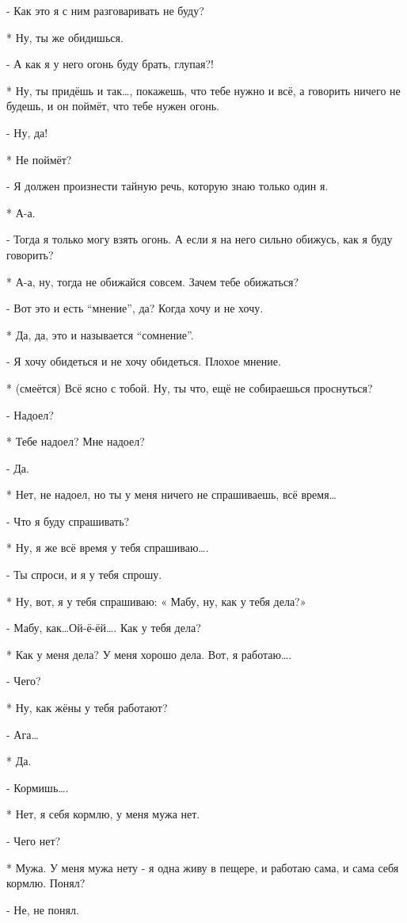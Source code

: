 - Как это я с ним разговаривать не буду?

* Ну, ты же обидишься.

- А как я у него огонь буду брать, глупая?!

* Ну, ты придёшь и так…, покажешь, что тебе нужно и всё, а говорить ничего не будешь, и он поймёт, что тебе нужен огонь.

- Ну, да!

* Не поймёт?

- Я должен произнести тайную речь, которую знаю только один я.

* А-а.

- Тогда я только могу взять огонь. А если я на него сильно обижусь, как я буду говорить?

* А-а, ну, тогда не обижайся совсем. Зачем тебе обижаться?

- Вот это и есть “мнение”, да? Когда хочу и не хочу.

* Да, да, это и называется “сомнение”.

- Я хочу обидеться и не хочу обидеться. Плохое мнение.

* (смеётся) Всё ясно с тобой. Ну, ты что, ещё не собираешься проснуться?

- Надоел?

* Тебе надоел? Мне надоел?

- Да.

* Нет, не надоел, но ты у меня ничего не спрашиваешь, всё время…

- Что я буду спрашивать?

* Ну, я же всё время у тебя спрашиваю….

- Ты спроси, и я у тебя спрошу.

* Ну, вот, я у тебя спрашиваю: « Мабу, ну, как у тебя дела?»

-  Мабу, как…Ой-ё-ёй…. Как у тебя дела?

* Как у меня дела? У меня хорошо дела. Вот, я работаю….

- Чего?

* Ну, как жёны у тебя работают?

- Ага…

* Да.

- Кормишь….

* Нет, я себя кормлю, у меня мужа нет.

- Чего нет?

* Мужа. У меня мужа нету - я одна живу в пещере, и работаю сама, и сама себя кормлю. Понял?

- Не, не понял.

